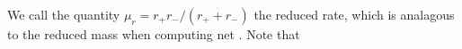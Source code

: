 We call the quantity \(\mu_r = r_+r_-/(r_+ + r_-)\) the reduced rate, which is analagous to the reduced mass when computing net .  Note that